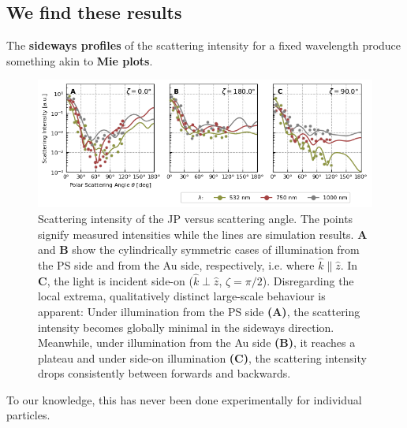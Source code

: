 \documentclass[10pt]{article}
\begin{document}
\subsection*{We find these results}

The \textbf{sideways profiles} of the scattering intensity for a fixed wavelength produce something akin to \textbf{Mie plots}. 
\begin{figure}[h!]
    \centering
    \includegraphics[width=\textwidth]{[fig] cartesian mieplots (3, placeholder)}
    \caption{Scattering intensity of the JP versus scattering angle. 
    The points signify measured intensities while the lines are simulation results.  
    {\sffamily\bfseries A} and {\sffamily\bfseries B} show the cylindrically symmetric cases of illumination from the PS side and from the Au side, respectively, i.e. where $\hat{k}\parallel\hat{z}$. 
    In {\sffamily\bfseries C}, the light is incident side-on ($\hat{k}\perp\hat{z}$, $\zeta=\pi/2$). 
    Disregarding the local extrema, qualitatively distinct large-scale behaviour is apparent: Under illumination from the PS side {\sffamily\bfseries (A)}, the scattering intensity becomes globally minimal in the sideways direction. 
    Meanwhile, under illumination from the Au side {\sffamily\bfseries (B)}, it reaches a plateau and under side-on illumination {\sffamily\bfseries (C)}, the scattering intensity drops consistently between forwards and backwards.  
    }
    \label{fig:jp-mieplots-oneline}
\end{figure}

To our knowledge, this has never been done experimentally for individual particles. \\

\end{document}
